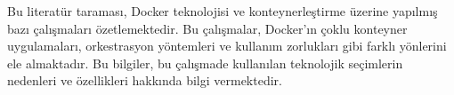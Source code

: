 Bu literatür taraması, Docker teknolojisi ve konteynerleştirme üzerine yapılmış bazı çalışmaları özetlemektedir. Bu çalışmalar, Docker'ın çoklu konteyner uygulamaları, orkestrasyon yöntemleri ve kullanım zorlukları gibi farklı yönlerini ele almaktadır. Bu bilgiler, bu çalışmade kullanılan teknolojik seçimlerin nedenleri ve özellikleri hakkında bilgi vermektedir.